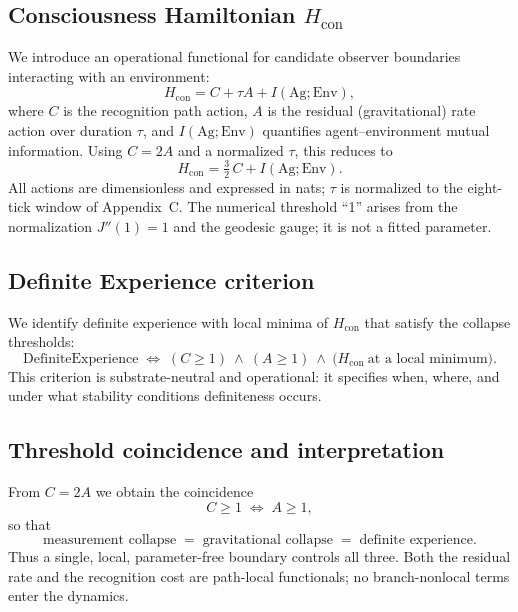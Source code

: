 \documentclass[reprint,aps,prd,nofootinbib]{revtex4-2}
\begin{document}
\subsection{Consciousness Hamiltonian $H_{\mathrm{con}}$}
We introduce an operational functional for candidate observer boundaries interacting with an environment:
\begin{equation}
  H_{\mathrm{con}} = C + \tau A + I(\mathrm{Ag};\mathrm{Env}),\label{eq:Hcon}
\end{equation}
where $C$ is the recognition path action, $A$ is the residual (gravitational) rate action over duration $\tau$, and $I(\mathrm{Ag};\mathrm{Env})$ quantifies agent--environment mutual information. Using $C=2A$ and a normalized $\tau$, this reduces to
\begin{equation}
  H_{\mathrm{con}} = \tfrac{3}{2}\,C + I(\mathrm{Ag};\mathrm{Env}).\label{eq:HconC}
\end{equation}
All actions are dimensionless and expressed in nats; $\tau$ is normalized to the eight-tick window of Appendix~C. The numerical threshold ``1'' arises from the normalization $J''(1)=1$ and the geodesic gauge; it is not a fitted parameter.

\subsection{Definite Experience criterion}
We identify definite experience with local minima of $H_{\mathrm{con}}$ that satisfy the collapse thresholds:
\begin{equation}
  \mathrm{DefiniteExperience}\;\Longleftrightarrow\; (C\ge 1)\ \wedge\ (A\ge 1)\ \wedge\ \big(H_{\mathrm{con}}\ \text{at a local minimum}\big).\label{eq:definite}
\end{equation}
This criterion is substrate-neutral and operational: it specifies when, where, and under what stability conditions definiteness occurs.

\subsection{Threshold coincidence and interpretation}
From $C=2A$ we obtain the coincidence
\begin{equation}
  C\ge 1\;\Longleftrightarrow\; A\ge 1,\label{eq:thresholds}
\end{equation}
so that
\begin{equation}
  \text{measurement collapse}\;=\;\text{gravitational collapse}\;=\;\text{definite experience}.
\end{equation}
Thus a single, local, parameter-free boundary controls all three. Both the residual rate and the recognition cost are path-local functionals; no branch-nonlocal terms enter the dynamics.
\end{document}
